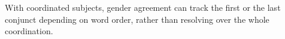 
With coordinated subjects, gender agreement can track the first or the last conjunct depending on word order, rather than resolving over the whole coordination.
